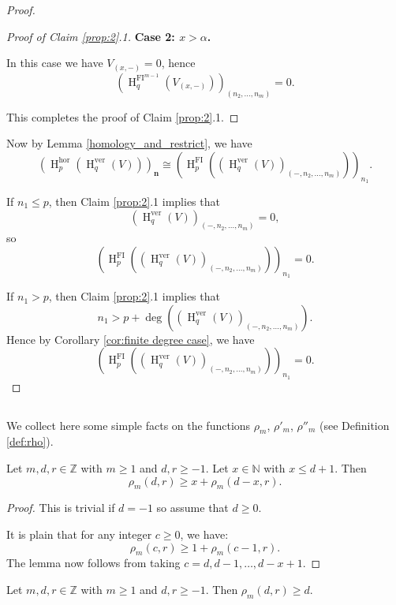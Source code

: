 \documentclass{amsart}
\numberwithin{equation}{section}
\DeclareMathOperator{\HH}{H}
\newcommand{\N}{{\mathbb{N}}}
\newcommand{\hor}{{\mathrm{hor}}}
\newcommand{\ver}{{\mathrm{ver}}}
\newcommand{\FI}{{\mathrm{FI}}}
\begin{document}
\begin{proof}
\begin{proof}[Proof of Claim \ref{prop:2}.1]
      \medskip 



      {\bf Case 2: $x>\alpha$.} 

      In this case we have $V_{(x, -)}=0$, hence 
      \[ (\HH^{\FI^{m-1}}_q(V_{(x, -)}))_{(n_2, \ldots, n_m)} = 0. \]

      \medskip 

      This completes the proof of Claim \ref{prop:2}.1.
   \end{proof}

     Now by Lemma \ref{homology_and_restrict}, we have
      \[  (\HH^\hor_p (\HH^\ver_q (V)))_{\mathbf{n}} \cong (\HH^{\FI}_p( (\HH^\ver_q (V) )_{(-, n_2, \ldots, n_m)}  ))_{n_1}. \]
   
      If $n_1 \leqslant p$, then Claim \ref{prop:2}.1 implies that 
      \[ (\HH^\ver_q(V))_{(-, n_2, \ldots, n_m)} = 0, \] 
      so 
      \[ (\HH^{\FI}_p( (\HH^\ver_q (V) )_{(-, n_2, \ldots, n_m)}  ))_{n_1} = 0. \]

      If $n_1 > p$, then Claim \ref{prop:2}.1 implies that 
      \[ n_1 > p + \deg\left( (\HH^\ver_q(V))_{(-, n_2, \ldots, n_m)} \right). \]
      Hence by Corollary \ref{cor:finite degree case}, we have 
      \[ (\HH^{\FI}_p((\HH^\ver_q(V))_{(-, n_2, \ldots, n_m)}))_{n_1} = 0. \] 
\end{proof}


\subsection{}

We collect here some simple facts on the functions $\rho_m$, $\rho'_m$, $\rho''_m$ (see Definition \ref{def:rho}).

\begin{lemma} \label{lem:rho increasing in d}
   Let $m,d,r\in \mathbb{Z}$ with $m\geqslant 1$ and $d, r\geqslant -1$. Let $x\in \N$ with $x\leqslant d+1$. Then 
   \[ \rho_m(d,r) \geqslant x + \rho_m(d-x,r). \]
\end{lemma}

\begin{proof}
   This is trivial if $d=-1$ so assume that $d\geqslant 0$. 

   It is plain that for any integer $c\geqslant 0$, we have:
   \[ \rho_m(c,r) \geqslant 1 + \rho_m(c-1,r). \] 
   The lemma now follows from taking $c=d, d-1, \ldots, d-x+1$. 
\end{proof}

\begin{corollary} \label{lem:rho at least d}
   Let $m,d,r\in \mathbb{Z}$ with $m\geqslant 1$ and $d, r\geqslant -1$. Then $\rho_m(d,r) \geqslant d$. 
\end{corollary}
\end{document}
